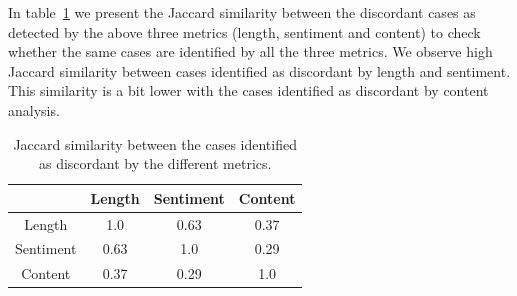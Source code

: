 In table~\ref{tab:jacc} we present the Jaccard similarity between the discordant cases as detected by the above three metrics (length, sentiment and content) to check 
whether the same cases are identified by all the three metrics. 
We observe high Jaccard similarity between cases identified as discordant by length and sentiment. This similarity is a bit lower with the cases identified as discordant 
by content analysis.

\begin{table}[]
\centering
\caption{Jaccard similarity between the cases identified as discordant by the different metrics.}
\label{tab:jacc}
\begin{tabular}{c|c|c|c}
\hline
          & Length & Sentiment & Content \\ \hline
Length    &    1.0    &   0.63        &  0.37       \\ 
Sentiment &    0.63    &   1.0        &  0.29       \\ 
Content   &    0.37    &   0.29        &  1.0       \\ \hline
\end{tabular}
\end{table}



